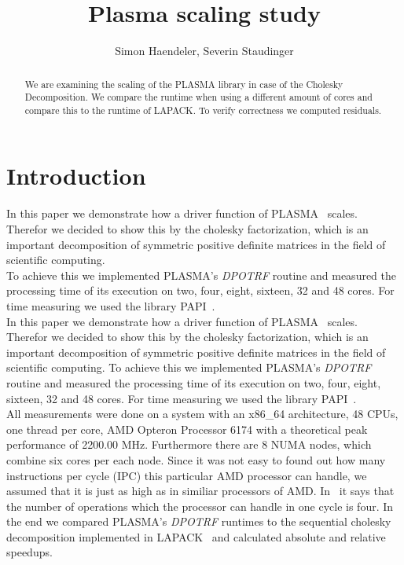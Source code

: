 \documentclass[a4paper,final,ngerman,english]{article}
\begin{document}
\lstset{postbreak=\space,breakindent=5pt,breaklines,basicstyle=\scriptsize,frame=trbl,label=DescriptiveLabel} %
\pagestyle{headings}
%
\title{Plasma scaling study}
\author{Simon Haendeler, Severin Staudinger}
\maketitle
%
\begin{abstract}
	We are examining the scaling of the PLASMA library in case of the Cholesky Decomposition.
	We compare the runtime when using a different amount of cores and compare this to the runtime
	of LAPACK\@. To verify correctness we computed residuals. 
\end{abstract}
\section{Introduction}
In this paper we demonstrate how a driver function of PLASMA~\cite{plasma01} scales.
Therefor we decided to show this by the cholesky factorization, which is an important decomposition of symmetric positive definite matrices in the field of scientific computing.\\
To achieve this we implemented PLASMA's \textit{DPOTRF} routine and measured the processing time of its execution on two, four, eight, sixteen, 32 and 48 cores. For time measuring we used the library PAPI~\cite{papi02}.\\
In this paper we demonstrate how a driver function of PLASMA~\cite{YarKhan2016} scales.
Therefor we decided to show this by the cholesky factorization, which is an important decomposition of symmetric positive definite matrices in the field of scientific computing.
To achieve this we implemented PLASMA's \textit{DPOTRF} routine and measured the processing time of its execution on two, four, eight, sixteen, 32 and 48 cores. For time measuring we used the library PAPI~\cite{icl:59}.\\
All measurements were done on a system with an x86\_64 architecture, 48 CPUs, one thread per core, AMD Opteron\texttrademark{} Processor 6174 with a theoretical peak performance of 2200.00 MHz. Furthermore there are 8 NUMA nodes, which combine six cores per each node.
Since it was not easy to found out how many instructions per cycle (IPC) this particular AMD processor can handle,
we assumed that it is just as high as in similiar processors of AMD\@. In~\cite{amd05} it says that the number of operations which the processor can handle in one cycle is four.
In the end we compared PLASMA's \textit{DPOTRF} runtimes to the sequential cholesky decomposition implemented in LAPACK~\cite{lapack03} and calculated absolute and relative speedups.
\end{document}
